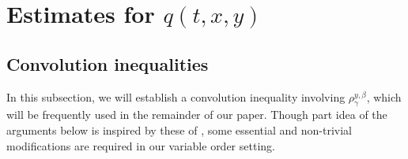 \documentclass[a4paper,11pt]{amsart}
\newcommand{\B}{\beta}
\newcommand{\G}{\gamma}
\theoremstyle{definition}
\begin{document}
\medskip


\section{Estimates for $q(t,x,y)$ }\label{section3}

\subsection{Convolution inequalities}\label{section3.1}
In this subsection, we will establish a convolution inequality
involving $\rho_\G^{y,\B}$, which will be frequently used in the
remainder of our paper. Though part idea of the arguments below is
inspired by these of \cite{CZ,Kol}, some essential and non-trivial
modifications are required in our variable order setting.
\end{document}
